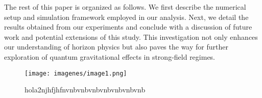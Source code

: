 \documentclass{article}
\begin{document}
The rest of this paper is organized as follows. We first describe the numerical setup and simulation framework employed in our analysis. Next, we detail the results obtained from our experiments and conclude with a discussion of future work and potential extensions of this study. This investigation not only enhances our understanding of horizon physics but also paves the way for further exploration of quantum gravitational effects in strong-field regimes.\begin{figure}\centering\texttt{[image: imagenes/image1.png]}\caption{hola2njhfjhfnvnbvnbvnbvnbvnbvnbvnb}\label{hola3}\end{figure}
\end{document}
